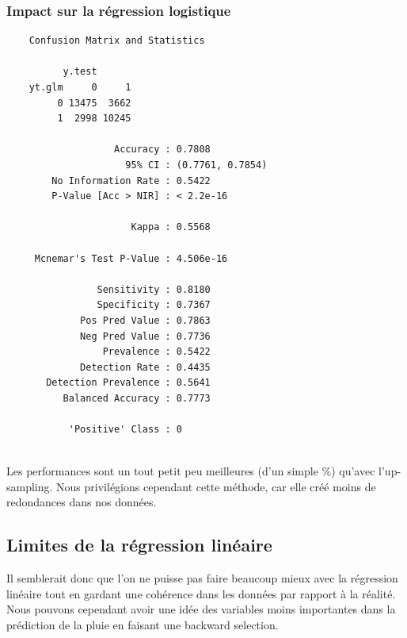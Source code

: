 \documentclass{article}
\begin{document}
\subsubsection{Impact sur la régression logistique}
\begin{multicols}{2}
    \begin{verbatim}
    Confusion Matrix and Statistics
  
          y.test
    yt.glm     0     1
         0 13475  3662
         1  2998 10245
                                              
                   Accuracy : 0.7808          
                     95% CI : (0.7761, 0.7854)
        No Information Rate : 0.5422          
        P-Value [Acc > NIR] : < 2.2e-16       
                                              
                      Kappa : 0.5568          
                                              
     Mcnemar's Test P-Value : 4.506e-16       
                                              
                Sensitivity : 0.8180          
                Specificity : 0.7367          
             Pos Pred Value : 0.7863          
             Neg Pred Value : 0.7736          
                 Prevalence : 0.5422          
             Detection Rate : 0.4435          
       Detection Prevalence : 0.5641          
          Balanced Accuracy : 0.7773          

           'Positive' Class : 0 
                                 
    \end{verbatim}
\end{multicols}

Les performances sont un tout petit peu meilleures (d'un simple \%) qu'avec l'up-sampling. Nous privilégions cependant cette méthode, car elle créé moins de redondances dans nos données. 

\subsection{Limites de la régression linéaire}

Il semblerait donc que l'on ne puisse pas faire beaucoup mieux avec la régression linéaire tout en gardant une cohérence dans les données par rapport à la réalité. Nous pouvons cependant avoir une idée des variables moins importantes dans la prédiction de la pluie en faisant une backward selection. 
\end{document}
